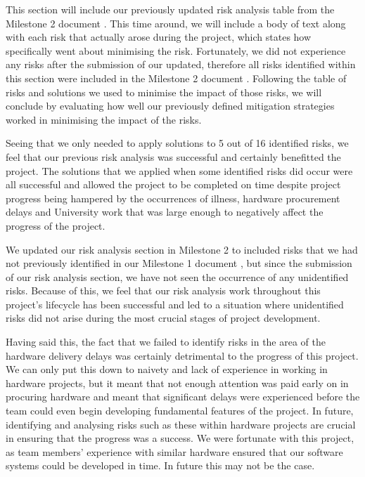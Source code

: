             This section will include our previously updated risk analysis table from the Milestone 2 document \cite{mile2}. This time around, we will include a body of text along with each risk that actually arose during the project, which states how specifically went about minimising the risk. Fortunately, we did not experience any risks after the submission of our updated, therefore all risks identified within this section were included in the Milestone 2 document \cite{mile2}. Following the table of risks and solutions we used to minimise the impact of those risks, we will conclude by evaluating how well our previously defined mitigation strategies worked in minimising the impact of the risks.

            \afterpage{%
                \clearpage%
                \thispagestyle{empty}%
                \begin{landscape}%
                    \centering %
                    
                \end{landscape}
                \clearpage%
            }

            Seeing that we only needed to apply solutions to 5 out of 16 identified risks, we feel that our previous risk analysis was successful and certainly benefitted the project. The solutions that we applied when some identified risks did occur were all successful and allowed the project to be completed on time despite project progress being hampered by the occurrences of illness, hardware procurement delays and University work that was large enough to negatively affect the progress of the project. 

            We updated our risk analysis section in Milestone 2 \cite{mile2} to included risks that we had not previously identified in our Milestone 1 document \cite{coaker}, but since the submission of our risk analysis section, we have not seen the occurrence of any unidentified risks. Because of this, we feel that our risk analysis work throughout this project's lifecycle has been successful and led to a situation where unidentified risks did not arise during the most crucial stages of project development.

            Having said this, the fact that we failed to identify risks in the area of the hardware delivery delays was certainly detrimental to the progress of this project. We can only put this down to naivety and lack of experience in working in hardware projects, but it meant that not enough attention was paid early on in procuring hardware and meant that significant delays were experienced before the team could even begin developing fundamental features of the project. In future, identifying and analysing risks such as these within hardware projects are crucial in ensuring that the progress was a success. We were fortunate with this project, as team members' experience with similar hardware ensured that our software systems could be developed in time. In future this may not be the case.

